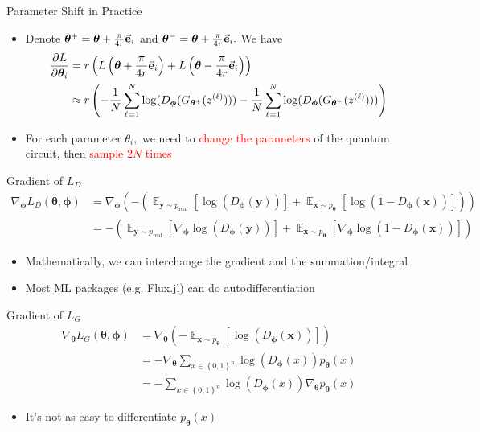 \documentclass[xcolor=dvipsnames]{beamer}
\DeclareMathOperator*{\E}{\mathbb{E}}
\newcommand{\set}[1]{\left\{#1\right\}}
\begin{document}
\begin{frame}{Parameter Shift in Practice}
  \begin{itemize}
    \item Denote ${\bm{\theta}}^+=\bm{\theta}+\frac{\pi}{4r}\vec{\bf{e}}_i$ and ${\bm{\theta}}^-=\bm{\theta}+\frac{\pi}{4r}\vec{\bf{e}}_i.$ We have
    \begin{align*}
      \frac{\partial L}{\partial\bm{\theta}_i}&=r\left(L\left(\bm{\theta}+\frac{\pi}{4r}\vec{\bf{e}}_i\right)+L\left(\bm{\theta}-\frac{\pi}{4r}\vec{\bf{e}}_i\right)\right)\\
      &\approx r\left(-\frac{1}{N}\sum_{\ell=1}^N\log(D_{\bm{\phi}}(G_{{\bm{\theta}}^+}(z^{(\ell)})))-\frac{1}{N}\sum_{\ell=1}^N\log(D_{\bm{\phi}}(G_{{\bm{\theta}}^-}(z^{(\ell)})))\right)
    \end{align*}
    \item For each parameter $\theta_i,$ we need to \textcolor{red}{change the parameters} of the quantum circuit, then \textcolor{red}{sample $2N$ times} 
  \end{itemize}

\end{frame}

\begin{frame}{Gradient of $L_D$}
  \begin{align*}
    \nabla_{\bm{\phi}} L_D({\bm{\theta}},{\bm{\phi}})&=\nabla_{\bm{\phi}}\left(-\left(\E_{\bm{y}\sim p_{\text{real}}}\left[\log(D_{\bm{\phi}}(\bm{y}))\right]+\E_{\bm{x}\sim p_{\bm{\theta}}}\left[\log(1-D_{\bm{\phi}}(\bm{x}))\right]\right)\right)\\
    &=-\left(\E_{\bm{y}\sim p_{\text{real}}}\left[\nabla_{\bm{\phi}}\log(D_{\bm{\phi}}(\bm{y}))\right]+\E_{\bm{x}\sim p_{\bm{\theta}}}\left[\nabla_{\bm{\phi}}\log(1-D_{\bm{\phi}}(\bm{x}))\right]\right)
  \end{align*}
  \begin{itemize}
    \item Mathematically, we can interchange the gradient and the summation/integral
    \item Most ML packages (e.g. Flux.jl) can do autodifferentiation
  \end{itemize}
\end{frame}

\begin{frame}{Gradient of $L_G$}
  \begin{align*}
    \nabla_{\bm{\theta}} L_G({\bm{\theta}},{\bm{\phi}})&=\nabla_{\bm{\theta}}\left(-\E_{\bm{x}\sim p_{\bm{\theta}}}\left[\log(D_{\bm{\phi}}(\bm{x}))\right]\right)\\
    &=-\nabla_{\bm{\theta}}\sum_{x\in\set{0,1}^n}\log(D_{\bm{\phi}}(x))p_{\bm{\theta}}(x)\\
    &=-\sum_{x\in\set{0,1}^n}\log(D_{\bm{\phi}}(x))\nabla_{\bm{\theta}} p_{\bm{\theta}}(x)
\end{align*}
\begin{itemize}
  \item It's not as easy to differentiate $p_{\bm{\theta}}(x)$
\end{itemize}
\end{frame}
\end{document}
